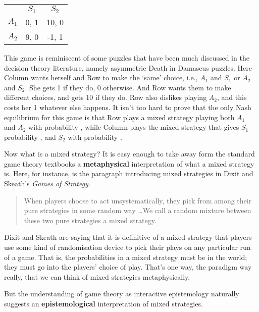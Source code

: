 \begin{center}
\begin{tabular}{r c c}
 & $S_1$ & $S_2$ \\
$A_1$ & 0, 1 & 10, 0 \\
$A_2$ & 9, 0 & -1, 1 
\end{tabular}
\end{center}

\noindent This game is reminiscent of some puzzles that have been much discussed in the decision theory literature, namely asymmetric Death in Damascus puzzles. Here Column wants herself and Row to make the `same' choice, i.e., $A_1$ and $S_1$ or $A_2$ and $S_2$. She gets 1 if they do, 0 otherwise. And Row wants them to make different choices, and gets 10 if they do. Row also dislikes playing $A_2$, and this costs her 1 whatever else happens. It isn't too hard to prove that the only Nash equilibrium for this game is that Row plays a mixed strategy playing both $A_1$ and $A_2$ with probability , while Column plays the mixed strategy that gives $S_1$ probability , and $S_2$ with probability .

Now what is a mixed strategy? It is easy enough to take away form the standard game theory textbooks a \textbf{metaphysical} interpretation of what a mixed strategy is. Here, for instance, is the paragraph introducing mixed strategies in Dixit and Skeath's \textit{Games of Strategy}.

\begin{quote}
When players choose to act unsystematically, they pick from among their pure strategies in some random way \dots We call a random mixture between these two pure strategies a mixed strategy. \citep[186]{DixitSkeath2004}
\end{quote}
Dixit and Skeath are saying that it is definitive of a mixed strategy that players use some kind of randomisation device to pick their plays on any particular run of a game. That is, the probabilities in a mixed strategy must be in the world; they must go into the players' choice of play. That's one way, the paradigm way really, that we can think of mixed strategies metaphysically.

But the understanding of game theory as interactive epistemology naturally suggests an \textbf{epistemological} interpretation of mixed strategies. %

